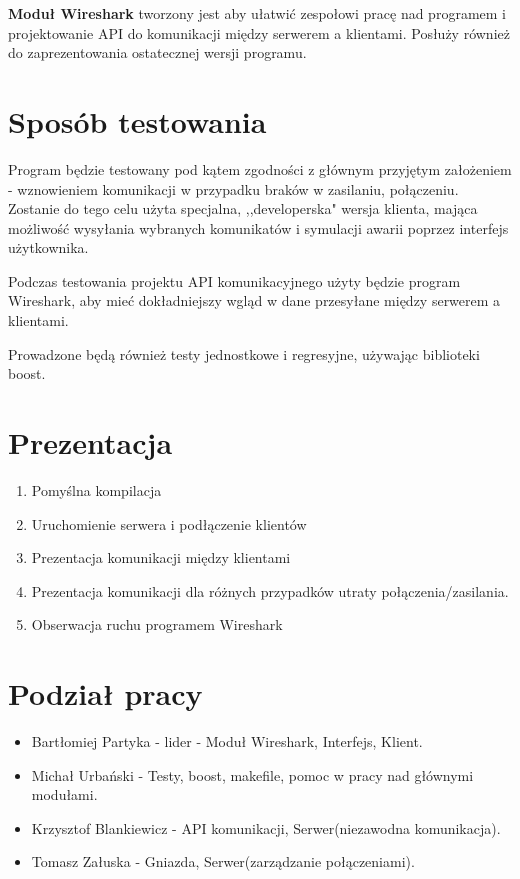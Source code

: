 \documentclass{article}
\begin{document}
\textbf{Moduł Wireshark} tworzony jest aby ułatwić zespołowi pracę nad programem i projektowanie API do komunikacji między serwerem a klientami. Posłuży również do zaprezentowania ostatecznej wersji programu.


\section{Sposób testowania\label{test}}

Program będzie testowany pod kątem zgodności z głównym przyjętym założeniem - wznowieniem komunikacji w przypadku braków w zasilaniu, połączeniu. Zostanie do tego celu użyta specjalna, ,,developerska" wersja klienta, mająca możliwość wysyłania wybranych komunikatów i symulacji awarii poprzez interfejs użytkownika.


Podczas testowania projektu API komunikacyjnego użyty będzie program Wireshark, aby mieć dokładniejszy wgląd w dane przesyłane między serwerem a klientami.

Prowadzone będą również testy jednostkowe i regresyjne, używając biblioteki boost.


\section{Prezentacja\label{prez}}

\begin{enumerate}
    \item Pomyślna kompilacja
    \item Uruchomienie serwera i podłączenie klientów
    \item Prezentacja komunikacji między klientami
    \item Prezentacja komunikacji dla różnych przypadków utraty połączenia/zasilania.
    \item Obserwacja ruchu programem Wireshark
\end{enumerate}
    

\section{Podział pracy\label{prac}}
\begin{itemize}
\item Bartłomiej Partyka - lider - Moduł Wireshark, Interfejs, Klient.

\item Michał Urbański - Testy, boost, makefile, pomoc w pracy nad głównymi modułami.

\item Krzysztof Blankiewicz - API komunikacji, Serwer(niezawodna komunikacja).

\item Tomasz Załuska - Gniazda, Serwer(zarządzanie połączeniami). 
\end{itemize}
\end{document}
